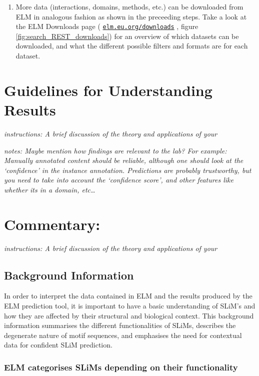 \documentclass[12pt]{article}
\newcommand\rurl[1]{%
	\href{http://#1}{\nolinkurl{#1}}%
}
\begin{document}
\begin{enumerate}
\item More data (interactions, domains, methods, etc.) can be downloaded from
	ELM in analogous fashion as shown in the preceeding steps. Take a look
	at the ELM Downloads page (\rurl{elm.eu.org/downloads}, figure
	\ref{fig:search_REST_downloads}) for an overview of which datasets can
	be downloaded, and what the different possible filters and formats are
	for each dataset.  

\end{enumerate}

\clearpage

\section*{Guidelines for Understanding Results}\label{guidelines-for-understanding-results}

\emph{instructions: A brief discussion of the theory and applications of
your}

\emph{notes: Maybe mention how findings are relevant to the lab? For
example: Manually annotated content should be reliable, although one
should look at the `confidence' in the instance annotation. Predictions
are probably trustworthy, but you need to take into account the
`confidence score', and other features like whether its in a domain,
etc\ldots{}}

\section*{Commentary:}\label{commentary}

\emph{instructions: A brief discussion of the theory and applications of
your}

\subsection*{Background Information}\label{background-information}

In order to interpret the data contained in ELM and the results produced by the
ELM prediction tool, it is important to have a basic understanding of SLiM's
and how they are affected by their structural and biological context. This 
background information summarises the different functionalities of SLiMs, 
describes the degenerate nature of motif sequences, and emphasises the need for 
contextual data for confident SLiM prediction.

\subsubsection*{ELM categorises SLiMs depending on their functionality}
\end{document}
